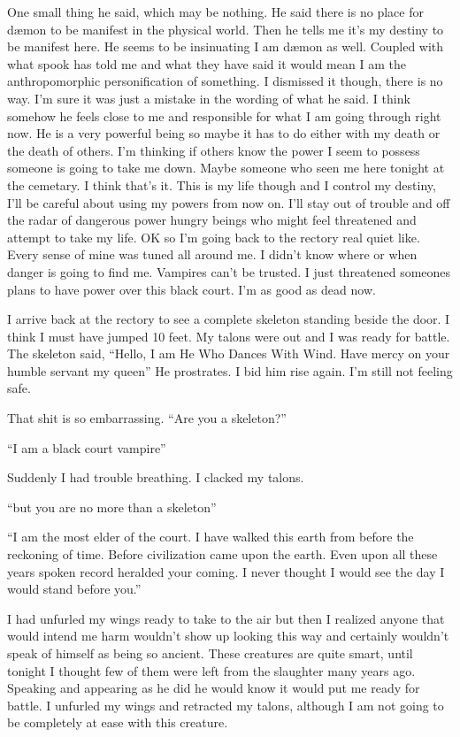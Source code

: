 One small thing he said, which may be nothing. He said there is no place for d\ae mon to be manifest in the physical world. Then he tells me it's my destiny to be manifest here. He seems to be insinuating I am d\ae mon as well. Coupled with what spook has told me and what they have said it would mean I am the anthropomorphic personification of something. I dismissed it though, there is no way. I'm sure it was just a mistake in the wording of what he said. I think somehow he feels close to me and responsible for what I am going through right now. He is a very powerful being so maybe it has to do either with my death or the death of others. I'm thinking if others know the power I seem to possess someone is going to take me down. Maybe someone who seen me here tonight at the cemetary. I think that's it. This is my life though and I control my destiny, I'll be careful about using my powers from now on. I'll stay out of trouble and off the radar of dangerous power hungry beings who might feel threatened and attempt to take my life.
OK so I'm going back to the rectory real quiet like. Every sense of mine was tuned all around me. I didn't know where or when danger is going to find me. Vampires can't be trusted. I just threatened someones plans to have power over this black court. I'm as good as dead now.

I arrive back at the rectory to see a complete skeleton standing beside the door. I think I must have jumped 10 feet. My talons were out and I was ready for battle. The skeleton said, ``Hello, I am He Who Dances With Wind. Have mercy on your humble servant my queen'' He prostrates. I bid him rise again. I'm still not feeling safe.

That shit is so embarrassing. ``Are you a skeleton?''

``I am a black court vampire''

Suddenly I had trouble breathing. I clacked my talons.

``but you are no more than a skeleton''

``I am the most elder of the court. I have walked this earth from before the reckoning of time. Before civilization came upon the earth. Even upon all these years spoken record heralded your coming. I never thought I would see the day I would stand before you.''

I had unfurled my wings ready to take to the air but then I realized anyone that would intend me harm wouldn't show up looking this way and certainly wouldn't speak of himself as being so ancient. These creatures are quite smart, until tonight I thought few of them were left from the slaughter many years ago. Speaking and appearing as he did he would know it would put me ready for battle. I unfurled my wings and retracted my talons, although I am not going to be completely at ease with this creature.

